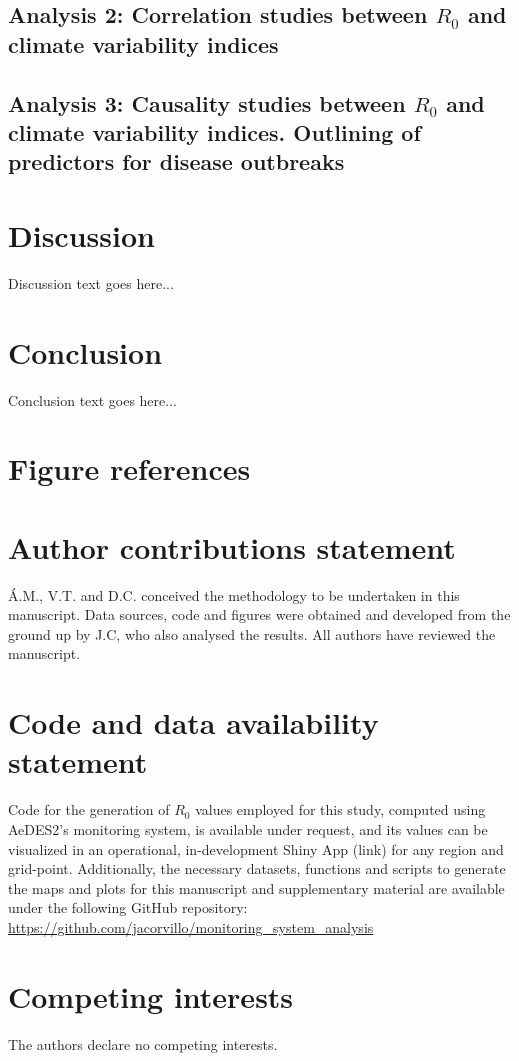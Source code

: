 \documentclass[fleqn,10pt]{wlscirep}
\begin{document}
  \subsection{Analysis 2: Correlation studies between $R_0$ and climate variability indices} \label{sec-results-2} \label{sec-results-2}

  \subsection{Analysis 3: Causality studies between $R_0$ and climate variability indices. Outlining of predictors for disease outbreaks} \label{sec-results-3}

  \section{Discussion}

  Discussion text goes here...

  \section{Conclusion}

  Conclusion text goes here...

% 

\section*{Figure references}

\section*{Author contributions statement}

Á.M., V.T. and D.C. conceived the methodology to be undertaken in this manuscript. Data sources, code and figures were obtained and developed from the ground up by J.C, who also analysed the results. All authors have reviewed the manuscript. 

\section*{Code and data availability statement}
    Code for the generation of $R_0$ values employed for this study, computed using AeDES2's monitoring system, is available under request, and its values can be visualized in an operational, in-development Shiny App (link) for any region and grid-point. Additionally, the necessary datasets, functions and scripts to generate the maps and plots for this manuscript and supplementary material are available under the following GitHub repository: \url{https://github.com/jacorvillo/monitoring_system_analysis}
\section*{Competing interests}
    The authors declare no competing interests.
\end{document}
